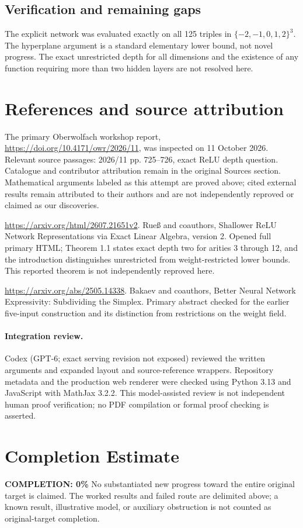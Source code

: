 \documentclass[11pt]{article}
\begin{document}
\subsection{Verification and remaining gaps}
The explicit network was evaluated exactly on all 125 triples in $\{-2,-1,0,1,2\}^3$. The hyperplane argument is a standard elementary lower bound, not novel progress. The exact unrestricted depth for all dimensions and the existence of any function requiring more than two hidden layers are not resolved here.

\section{References and source attribution}
The primary Oberwolfach workshop report, \url{https://doi.org/10.4171/owr/2026/11}, was inspected on 11 October 2026. Relevant source passages: 2026/11 pp. 725--726, exact ReLU depth question. Catalogue and contributor attribution remain in the original Sources section. Mathematical arguments labeled as this attempt are proved above; cited external results remain attributed to their authors and are not independently reproved or claimed as our discoveries.

\url{https://arxiv.org/html/2607.21651v2}. Rueß and coauthors, Shallower ReLU Network Representations via Exact Linear Algebra, version 2. Opened full primary HTML; Theorem 1.1 states exact depth two for arities 3 through 12, and the introduction distinguishes unrestricted from weight-restricted lower bounds. This reported theorem is not independently reproved here.

\url{https://arxiv.org/abs/2505.14338}. Bakaev and coauthors, Better Neural Network Expressivity: Subdividing the Simplex. Primary abstract checked for the earlier five-input construction and its distinction from restrictions on the weight field.


\paragraph{Integration review.} Codex (GPT-6; exact serving revision not exposed) reviewed the written arguments and expanded layout and source-reference wrappers. Repository metadata and the production web renderer were checked using Python 3.13 and JavaScript with MathJax 3.2.2. This model-assisted review is not independent human proof verification; no PDF compilation or formal proof checking is asserted.

\section{Completion Estimate}
\noindent\textbf{COMPLETION: 0\%}
No substantiated new progress toward the entire original target is claimed. The worked results and failed route are delimited above; a known result, illustrative model, or auxiliary obstruction is not counted as original-target completion.
\end{document}

